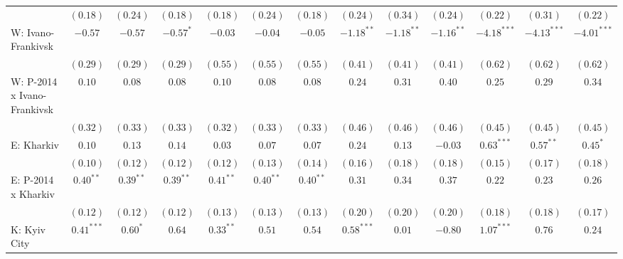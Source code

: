 \begin{table}
\begin{center}
\begin{tiny}
\begin{tabular}{l c c c c c c c c c c c c}
                            & $(0.18)$      & $(0.24)$      & $(0.18)$      & $(0.18)$     & $(0.24)$     & $(0.18)$     & $(0.24)$      & $(0.34)$     & $(0.24)$       & $(0.22)$      & $(0.31)$      & $(0.22)$      \\
W: Ivano-Frankivsk          & $-0.57$       & $-0.57$       & $-0.57^{*}$   & $-0.03$      & $-0.04$      & $-0.05$      & $-1.18^{**}$  & $-1.18^{**}$ & $-1.16^{**}$   & $-4.18^{***}$ & $-4.13^{***}$ & $-4.01^{***}$ \\
                            & $(0.29)$      & $(0.29)$      & $(0.29)$      & $(0.55)$     & $(0.55)$     & $(0.55)$     & $(0.41)$      & $(0.41)$     & $(0.41)$       & $(0.62)$      & $(0.62)$      & $(0.62)$      \\
W: P-2014 x Ivano-Frankivsk & $0.10$        & $0.08$        & $0.08$        & $0.10$       & $0.08$       & $0.08$       & $0.24$        & $0.31$       & $0.40$         & $0.25$        & $0.29$        & $0.34$        \\
                            & $(0.32)$      & $(0.33)$      & $(0.33)$      & $(0.32)$     & $(0.33)$     & $(0.33)$     & $(0.46)$      & $(0.46)$     & $(0.46)$       & $(0.45)$      & $(0.45)$      & $(0.45)$      \\
E: Kharkiv                  & $0.10$        & $0.13$        & $0.14$        & $0.03$       & $0.07$       & $0.07$       & $0.24$        & $0.13$       & $-0.03$        & $0.63^{***}$  & $0.57^{**}$   & $0.45^{*}$    \\
                            & $(0.10)$      & $(0.12)$      & $(0.12)$      & $(0.12)$     & $(0.13)$     & $(0.14)$     & $(0.16)$      & $(0.18)$     & $(0.18)$       & $(0.15)$      & $(0.17)$      & $(0.18)$      \\
E: P-2014 x Kharkiv         & $0.40^{**}$   & $0.39^{**}$   & $0.39^{**}$   & $0.41^{**}$  & $0.40^{**}$  & $0.40^{**}$  & $0.31$        & $0.34$       & $0.37$         & $0.22$        & $0.23$        & $0.26$        \\
                            & $(0.12)$      & $(0.12)$      & $(0.12)$      & $(0.13)$     & $(0.13)$     & $(0.13)$     & $(0.20)$      & $(0.20)$     & $(0.20)$       & $(0.18)$      & $(0.18)$      & $(0.17)$      \\
K: Kyiv City                & $0.41^{***}$  & $0.60^{*}$    & $0.64$        & $0.33^{**}$  & $0.51$       & $0.54$       & $0.58^{***}$  & $0.01$       & $-0.80$        & $1.07^{***}$  & $0.76$        & $0.24$        \\

\end{tabular}
\end{tiny}
\end{center}
\end{table}
